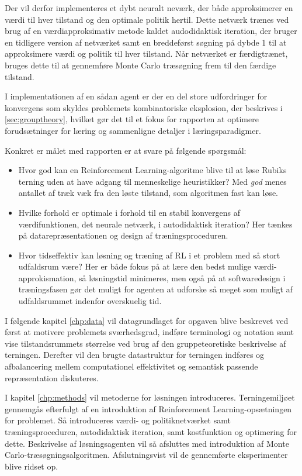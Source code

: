 \documentclass[../main.tex]{subfiles}
\begin{document}
Der vil derfor implementeres et dybt neuralt neværk, der både approksimerer en værdi til hver tilstand og den optimale politik hertil. Dette netværk trænes ved brug af en værdiapproksimativ metode kaldet audodidaktisk iteration, der bruger en tidligere version af netværket samt en breddeførst søgning på dybde 1 til at approksimere værdi og politik til hver tilstand.
Når netværket er færdigtrænet, bruges dette til at gennemføre Monte Carlo træsøgning frem til den færdige tilstand. 

I implementationen af en sådan agent er der en del store udfordringer for konvergens som skyldes problemets kombinatoriske eksplosion, der beskrives i \ref{sec:grouptheory}, hvilket gør det til et fokus for rapporten at optimere forudsætninger for læring og sammenligne detaljer i læringsparadigmer.


Konkret er målet med rapporten er at svare på følgende spørgsmål:
\begin{itemize}
	\item Hvor god kan en Reinforcement Learning-algoritme blive til at løse Rubiks terning uden at have adgang til menneskelige heuristikker? Med \textit{god} menes antallet af træk væk fra den løste tilstand, som algoritmen fast kan løse.
	\item Hvilke forhold er optimale i forhold til en stabil konvergens af værdifunktionen, det neurale netværk, i autodidaktisk iteration? Her tænkes på datarepræsentationen og design af træningsproceduren.
	\item Hvor tidseffektiv kan løsning og træning af RL i et problem med så stort udfaldsrum være? Her er både fokus på  at lære den bedst mulige værdi-approkismation, så løsningstid minimeres, men også på at softwaredesign i træningsfasen gør det muligt for agenten at udforske så meget som muligt af udfaldsrummet indenfor overskuelig tid.
\end{itemize}
\noindent
I følgende kapitel \eqref{chp:data} vil datagrundlaget for opgaven blive beskrevet ved først at motivere problemets sværhedsgrad, indføre terminologi og notation samt vise tilstandsrummets størrelse ved brug af den gruppeteoretiske beskrivelse af terningen. Derefter vil den brugte datastruktur for terningen indføres og afbalancering mellem computationel effektivitet og semantisk passende repræsentation diskuteres.

I kapitel \ref{chp:methods} vil metoderne for løsningen introduceres. Terningemiljøet gennemgås efterfulgt af en introduktion af Reinforcement Learning-opsætningen for problemet. Så introduceres værdi- og politiknetværket samt træningsproceduren, autodidaktisk iteration, samt kostfunktion og optimering for dette. Beskrivelse af løsningsagenten vil så afsluttes med introduktion af Monte Carlo-træsøgningsalgoritmen. Afslutningsvist  vil de gennemførte eksperimenter blive ridset op.



 
\end{document}
